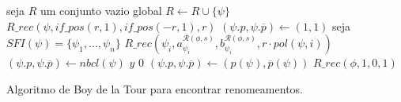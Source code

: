 
\begin{algorithm}
	\begin{algorithmic}[1]
		\State seja $R$ um conjunto vazio global
		\State $R \gets R \cup \{\psi \}$
		\State $R\_rec(\psi,if\_pos(r,1),if\_pos(-r,1),r)$
		\State $(\psi.p,\psi.\overline{p}) \gets (1,1)$
		\Else
		\State seja $SFI(\psi) = \{\psi_1,...,\psi_n \}$
		\State $R\_rec(\psi_i,a_{\psi_i}^{\mathcal{R}(\phi,s)},b_{\psi_i}^{\mathcal{R}(\phi,s)},r \cdot pol(\psi,i))$
		\EndFor
		\State $(\psi.p,\psi.\overline{p}) \gets nbcl(\psi)$
		\EndIf
		\EndIf
		\EndFunction
		\Return $y$
		\EndIf
		\Return $0$
		\EndFunction
		\State $(\psi.p,\psi.\overline{p}) \gets (p(\psi),\overline{p}(\psi))$
		\EndFor
		\State $R\_rec(\phi,1,0,1)$
	\end{algorithmic}
	\caption{Algoritmo de Boy de la Tour para encontrar renomeamentos.}
	\label{boydelatour}
\end{algorithm}

